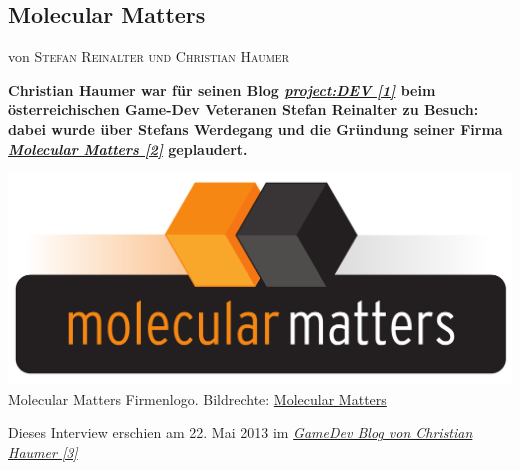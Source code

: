 \documentclass[10pt,a4paper,ngerman,twoside]{article} %
\newcommand{\NewsItem}[1]{ %
\usefont{T1}{fvs}{n}{n} %
\vspace{24pt}\large #1\vspace{3pt} %
\par \normalsize \normalfont}
\newcommand{\NewsAuthor}[1]{ %
\hfill von \textsc{#1} \vspace{20pt} %
\par \normalfont}
\begin{document}
\begin{multicols}{3} 
\NewsItem{}
\section*{Molecular Matters}
\label{molecularmatters}
\NewsAuthor{Stefan Reinalter und Christian Haumer}

\textbf{Christian Haumer  war für seinen Blog \href{http://projectdev.humepage.at/}{\textit{project:DEV [1]}} beim österreichischen Game-Dev Veteranen Stefan Reinalter zu Besuch: dabei wurde über Stefans Werdegang und die Gründung seiner Firma \href{http://www.molecular-matters.com/company/company.html}{\textit{Molecular Matters [2]}} geplaudert.} 
\begin{center}
\includegraphics[width=\linewidth]{molecularmatters/molecularmatters.png} 
\footnotesize{Molecular Matters Firmenlogo. Bildrechte: \href{http://www.molecular-matters.com}{Molecular Matters}} \\
\end{center}

Dieses Interview erschien am 22. Mai 2013 im \href{http://projectdev.humepage.at/1419}{\textit{GameDev Blog von Christian Haumer [3]}}


\end{multicols}
\end{document}
